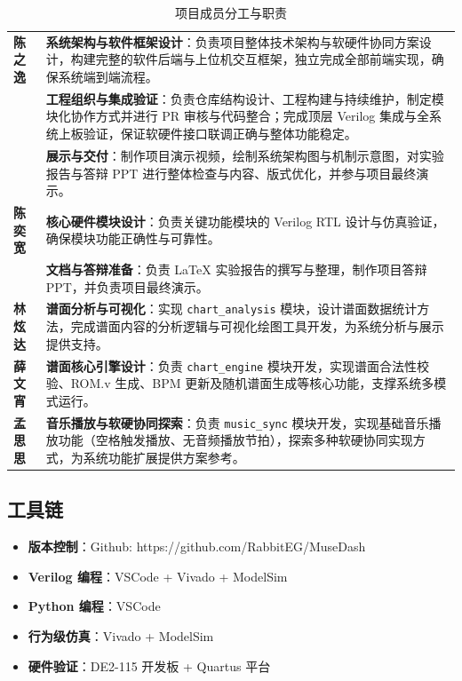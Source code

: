 \documentclass[12pt, a4paper]{article}
\begin{document}
\begin{table}[htbp]
    \centering
    \caption{项目成员分工与职责}
    \label{tab:team-division}
    {\footnotesize
    \begin{tabularx}{\linewidth}{l X}
    \textbf{陈之逸} &
    \textbf{系统架构与软件框架设计}：负责项目整体技术架构与软硬件协同方案设计，构建完整的软件后端与上位机交互框架，独立完成全部前端实现，确保系统端到端流程。\\
    &
    \textbf{工程组织与集成验证}：负责仓库结构设计、工程构建与持续维护，制定模块化协作方式并进行 PR 审核与代码整合；完成顶层 Verilog 集成与全系统上板验证，保证软硬件接口联调正确与整体功能稳定。\\
    &
    \textbf{展示与交付}：制作项目演示视频，绘制系统架构图与机制示意图，对实验报告与答辩 PPT 进行整体检查与内容、版式优化，并参与项目最终演示。\\[1ex]

    \textbf{陈奕宽} &
    \textbf{核心硬件模块设计}：负责关键功能模块的 Verilog RTL 设计与仿真验证，确保模块功能正确性与可靠性。\\
    &
    \textbf{文档与答辩准备}：负责 LaTeX 实验报告的撰写与整理，制作项目答辩 PPT，并负责项目最终演示。\\[1ex]

    \textbf{林炫达} &
    \textbf{谱面分析与可视化}：实现 \texttt{chart\_analysis} 模块，设计谱面数据统计方法，完成谱面内容的分析逻辑与可视化绘图工具开发，为系统分析与展示提供支持。\\[1ex]

    \textbf{薛文宵} &
    \textbf{谱面核心引擎设计}：负责 \texttt{chart\_engine} 模块开发，实现谱面合法性校验、ROM.v 生成、BPM 更新及随机谱面生成等核心功能，支撑系统多模式运行。\\[1ex]

    \textbf{孟思思} &
    \textbf{音乐播放与软硬协同探索}：负责 \texttt{music\_sync} 模块开发，实现基础音乐播放功能（空格触发播放、无音频播放节拍），探索多种软硬协同实现方式，为系统功能扩展提供方案参考。
    \end{tabularx}
    }
\end{table}


\subsection{工具链}
\begin{itemize}
    \item \textbf{版本控制}：Github: https://github.com/RabbitEG/MuseDash
    \item \textbf{Verilog 编程}：VSCode + Vivado + ModelSim
    \item \textbf{Python 编程}：VSCode
    \item \textbf{行为级仿真}：Vivado + ModelSim
    \item \textbf{硬件验证}：DE2-115 开发板 + Quartus 平台
\end{itemize}
\end{document}
